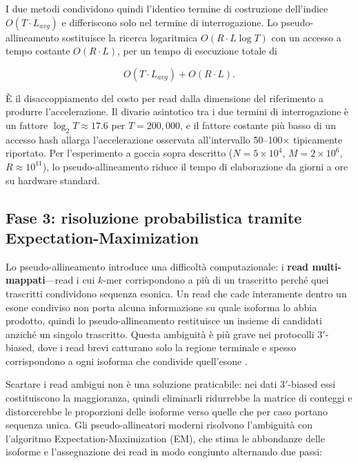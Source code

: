 I due metodi condividono quindi l'identico termine di costruzione dell'indice $O(T \cdot L_{avg})$ e differiscono solo nel termine di interrogazione. Lo pseudo-allineamento sostituisce la ricerca logaritmica $O(R \cdot L \log T)$ con un accesso a tempo costante $O(R \cdot L)$, per un tempo di esecuzione totale di

$$O(T \cdot L_{avg}) + O(R \cdot L).$$

È il disaccoppiamento del costo per read dalla dimensione del riferimento a produrre l'accelerazione. Il divario asintotico tra i due termini di interrogazione è un fattore $\log_2 T \approx 17.6$ per $T = 200{,}000$, e il fattore costante più basso di un accesso hash allarga l'accelerazione osservata all'intervallo 50--100× tipicamente riportato. Per l'esperimento a goccia sopra descritto ($N = 5 \times 10^4$, $M = 2 \times 10^6$, $R \approx 10^{11}$), lo pseudo-allineamento riduce il tempo di elaborazione da giorni a ore su hardware standard.


\subsection{Fase 3: risoluzione probabilistica tramite Expectation-Maximization}
Lo pseudo-allineamento introduce una difficoltà computazionale: i \textbf{read multi-mappati}---read i cui $k$-mer corrispondono a più di un trascritto perché quei trascritti condividono sequenza esonica. Un read che cade interamente dentro un esone condiviso non porta alcuna informazione su quale isoforma lo abbia prodotto, quindi lo pseudo-allineamento restituisce un insieme di candidati anziché un singolo trascritto. Questa ambiguità è più grave nei protocolli $3'$-biased, dove i read brevi catturano solo la regione terminale e spesso corrispondono a ogni isoforma che condivide quell'esone \cite{galfre2021cotan}.

Scartare i read ambigui non è una soluzione praticabile: nei dati $3'$-biased essi costituiscono la maggioranza, quindi eliminarli ridurrebbe la matrice di conteggi e distorcerebbe le proporzioni delle isoforme verso quelle che per caso portano sequenza unica. Gli pseudo-allineatori moderni risolvono l'ambiguità con l'algoritmo Expectation-Maximization (EM), che stima le abbondanze delle isoforme e l'assegnazione dei read in modo congiunto alternando due passi:

